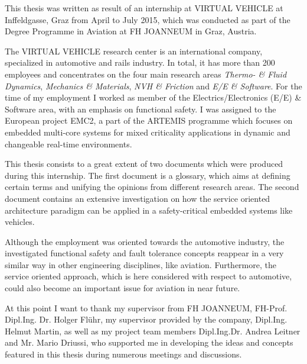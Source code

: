This thesis was written as result of an internship at VIRTUAL VEHICLE at Inffeldgasse, Graz from April to July 2015, which was conducted as part of the Degree Programme in Aviation at FH JOANNEUM in Graz, Austria.

The VIRTUAL VEHICLE research center is an international company, specialized in automotive and rails industry. In total, it has more than 200 employees and concentrates on the four main research areas \emph{Thermo- \& Fluid Dynamics}, \emph{Mechanics \& Materials}, \emph{NVH \& Friction} and \emph{E/E \& Software}. For the time of my employment I worked as member of the Electrics/Electronics (E/E) \& Software area, with an emphasis on functional safety. I was assigned to the European project EMC2, a part of the ARTEMIS programme which focuses on embedded multi-core systems for mixed criticality applications in dynamic and changeable real-time environments. 

This thesis consists to a great extent of two documents which were produced during this internship. The first document is a glossary, which aims at defining certain terms and unifying the opinions from different research areas. The second document contains an extensive investigation on how the service oriented architecture paradigm can be applied in a safety-critical embedded systems like vehicles.

Although the employment was oriented towards the automotive industry, the investigated functional safety and fault tolerance concepts reappear in a very similar way in other engineering disciplines, like aviation. Furthermore, the service oriented approach, which is here considered with respect to automotive, could also become an important issue for aviation in near future.

At this point I want to thank my supervisor from FH JOANNEUM, FH-Prof. Dipl.Ing. Dr. Holger Flühr, my supervisor provided by the company, Dipl.Ing. Helmut Martin, as well as my project team members Dipl.Ing.Dr. Andrea Leitner and Mr. Mario Driussi, who supported me in developing the ideas and concepts featured in this thesis during numerous meetings and discussions.
